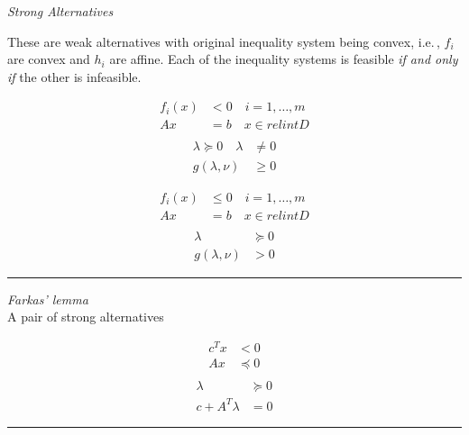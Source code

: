 \noindent
\textit{Strong Alternatives}

These are weak alternatives with original inequality system being 
convex,
i.e.\,, \(f_i\) are convex and \(h_i\) are affine. Each of the 
inequality systems is feasible \textit{if and only if} 
the other is infeasible.

\begin{multicols}{2}
  \begin{align*}
    f_i(x) &< 0 \quad i=1,\ldots,m\\
    Ax&=b \quad x \in relint D
  \end{align*}
  \begin{align*}\\
    \lambda \succeq 0 \quad
    \lambda &\ne 0\\
    g(\lambda,\nu) &\ge 0
  \end{align*}
\end{multicols}

\begin{multicols}{2}
  \begin{align*}
    f_i(x) &\le 0 \quad i=1,\ldots,m\\
    Ax&=b \quad x \in relint D
  \end{align*}
  \begin{align*}\\
    \lambda &\succeq 0 \\
    g(\lambda,\nu) &> 0
  \end{align*}
\end{multicols}
\noindent
\rule{\linewidth}{0.1mm}

\noindent
\textit{Farkas' lemma}\\
A pair of strong alternatives
\begin{multicols}{2}
  \begin{align*}
    c^Tx &< 0\\
    Ax &\preceq 0
  \end{align*}
  \begin{align*}\\
    \lambda &\succeq 0\\
    c + A^T \lambda &=0
  \end{align*}
\end{multicols}
\noindent
\rule{\linewidth}{0.1mm}